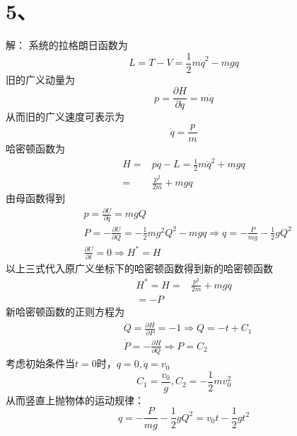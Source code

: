 \documentclass[10pt,a4paper]{article}
\begin{document}
\section*{5、}解：
系统的拉格朗日函数为
\[
L=T-V=\frac{1}{2}m\dot{q}^2-mgq
\]
旧的广义动量为
\[
p=\frac{\partial H}{\partial\dot{q}}=m\dot{q}
\]
从而旧的广义速度可表示为
\[
\dot{q}=\frac{p}{m}
\]
哈密顿函数为
\begin{align*}
H=&p\dot{q}-L=\frac{1}{2}m\dot{q}^2+mgq\\
=&\frac{p^2}{2m}+mgq
\end{align*}
由母函数得到
\begin{align*}
&p=\frac{\partial U}{\partial q}=mgQ\\
&P=-\frac{\partial U}{\partial Q}=-\frac{1}{2}mg^2Q^2-mgq\Longrightarrow q=-\frac{P}{mg}-\frac{1}{2}gQ^2\\
&\frac{\partial U}{\partial t}=0\Longrightarrow H^*=H
\end{align*}
以上三式代入原广义坐标下的哈密顿函数得到新的哈密顿函数
\begin{align*}
H^*=H=&\frac{p^2}{2m}+mgq\\
=-P
\end{align*}
新哈密顿函数的正则方程为
\begin{align*}
&\dot{Q}=\frac{\partial H}{\partial P}=-1\Longrightarrow Q=-t+C_1\\
&\dot{P}=-\frac{\partial H}{\partial Q}\Longrightarrow P=C_2
\end{align*}
考虑初始条件当$t=0$时，$q=0,\dot{q}=v_0$
\[
C_1=\frac{v_0}{g}, C_2=-\frac{1}{2}mv_0^2
\]
从而竖直上抛物体的运动规律：
\[
q=-\frac{P}{mg}-\frac{1}{2}gQ^2=v_0t-\frac{1}{2}gt^2
\]
\end{document}
